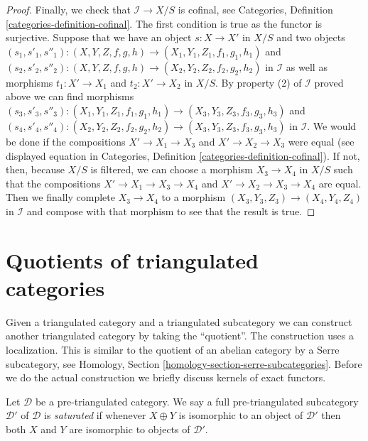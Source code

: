 \begin{proof}
\medskip\noindent
Finally, we check that $\mathcal{I} \to X/S$ is cofinal, see
Categories, Definition \ref{categories-definition-cofinal}.
The first condition is true as the functor is surjective.
Suppose that we have an object $s : X \to X'$ in $X/S$ and
two objects
$(s_1, s'_1, s''_1) : (X, Y, Z, f, g, h) \to (X_1, Y_1, Z_1, f_1, g_1, h_1)$
and
$(s_2, s'_2, s''_2) : (X, Y, Z, f, g, h) \to (X_2, Y_2, Z_2, f_2, g_2, h_2)$
in $\mathcal{I}$ as well as morphisms $t_1 : X' \to X_1$ and
$t_2 : X' \to X_2$ in $X/S$. By property (2) of $\mathcal{I}$
proved above we can find morphisms
$(s_3, s'_3, s''_3) : (X_1, Y_1, Z_1, f_1, g_1, h_1) \to
(X_3, Y_3, Z_3, f_3, g_3, h_3)$
and
$(s_4, s'_4, s''_4) : (X_2, Y_2, Z_2, f_2, g_2, h_2) \to
(X_3, Y_3, Z_3, f_3, g_3, h_3)$ in $\mathcal{I}$.
We would be done if the compositions
$X' \to X_1 \to X_3$ and $X' \to X_2 \to X_3$ were equal
(see displayed equation in 
Categories, Definition \ref{categories-definition-cofinal}).
If not, then, because $X/S$ is filtered, we can choose
a morphism $X_3 \to X_4$ in $X/S$ such that the compositions
$X' \to X_1 \to X_3 \to X_4$ and $X' \to X_2 \to X_3 \to X_4$ are equal.
Then we finally complete $X_3 \to X_4$ to a morphism
$(X_3, Y_3, Z_3) \to (X_4, Y_4, Z_4)$ in $\mathcal{I}$
and compose with that morphism to see that the result is true.
\end{proof}









\section{Quotients of triangulated categories}
\label{section-quotients}

\noindent
Given a triangulated category and a triangulated subcategory we can
construct another triangulated category by taking the ``quotient''.
The construction uses a localization. This is similar to the quotient
of an abelian category by a Serre subcategory, see
Homology, Section \ref{homology-section-serre-subcategories}.
Before we do the actual construction we briefly discuss kernels
of exact functors.

\begin{definition}
\label{definition-saturated}
Let $\mathcal{D}$ be a pre-triangulated category. We say a full
pre-triangulated subcategory $\mathcal{D}'$ of $\mathcal{D}$ is
{\it saturated} if whenever $X \oplus Y$ is isomorphic to an object
of $\mathcal{D}'$ then both $X$ and $Y$ are isomorphic to objects
of $\mathcal{D}'$.
\end{definition}

